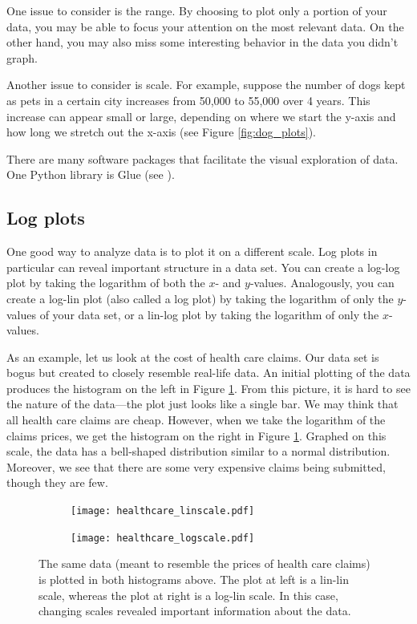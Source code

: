 One issue to consider is the range. 
By choosing to plot only a portion of your data, you may be able to focus your attention on the most relevant data. 
On the other hand, you may also miss some interesting behavior in the data you didn't graph.

Another issue to consider is scale. 
For example, suppose the number of dogs kept as pets in a certain city increases from 50,000 to 55,000 over 4 years. 
This increase can appear small or large, depending on where we start the y-axis and how long we stretch out the x-axis (see Figure \ref{fig:dog_plots}).

There are many software packages that facilitate the visual exploration of data. 
One Python library is Glue (see \cite{glue}).


\subsection*{Log plots}

One good way to analyze data is to plot it on a different scale. 
Log plots in particular can reveal important structure in a data set. 
You can create a log-log plot by taking the logarithm of both the $x$- and $y$-values. 
Analogously, you can create a log-lin plot (also called a log plot) by taking the logarithm of only the $y$-values of your data set, or a lin-log plot by taking the logarithm of only the $x$-values.

As an example, let us look at the cost of health care claims. 
Our data set is bogus but created to closely resemble real-life data. 
An initial plotting of the data produces the histogram on the left in Figure \ref{fig:healthcare}. 
From this picture, it is hard to see the nature of the data---the plot just looks like a single bar. 
We may think that all health care claims are cheap. 
However, when we take the logarithm of the claims prices, we get the histogram on the right in Figure \ref{fig:healthcare}. 
Graphed on this scale, the data has a bell-shaped distribution similar to a normal distribution. 
Moreover, we see that there are some very expensive claims being submitted, though they are few. 
\begin{figure}
\centering
\begin{subfigure}{.5\textwidth}
  \centering
  \texttt{[image: healthcare\_linscale.pdf]}
\end{subfigure}%
\begin{subfigure}{.5\textwidth}
  \centering
  \texttt{[image: healthcare\_logscale.pdf]}
\end{subfigure}
\caption{The same data (meant to resemble the prices of health care claims) is plotted in both histograms above. 
The plot at left is a lin-lin scale, whereas the plot at right is a log-lin scale. 
In this case, changing scales revealed important information about the data.}
\label{fig:healthcare}
\end{figure}

